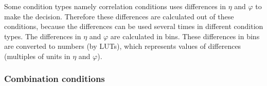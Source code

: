 Some condition types namely correlation conditions uses differences in $\eta$ and $\varphi$ to make the decision.
Therefore these differences are calculated out of these conditions, because the differences can be used several times in different condition types.
The differences in $\eta$ and $\varphi$ are calculated in bins. These differences in bins are converted to numbers (by LUTs),
which represents values of differences (multiples of units in $\eta$ and $\varphi$).

\subsubsection{Combination conditions}
\label{sec:gtl:combination_conditions}

